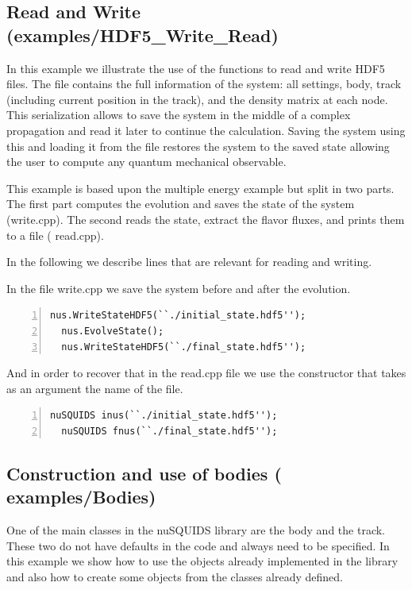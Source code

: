 \documentclass[3p,12pt]{elsarticle}
\newcommand{\ttf}{\ttfamily}
\begin{document}
\subsection{Read and Write \textnormal{({\ttf examples/HDF5\_Write\_Read})}}
\label{sec:readwrite}
In this example we illustrate the use of the functions to
read and write {\ttf HDF5} files. The file contains the full
information of the system: all settings, body, track (including
current position in the track), and the density matrix at each node.
This serialization allows to save the system
in the middle of a complex propagation and read it later to continue
the calculation. Saving the system using this and loading it from
the file restores the system to the saved state allowing the user to
compute any quantum mechanical observable.

This example is based upon the multiple energy example but
split in two parts. The first part computes the evolution and saves the
state of the system ({\ttf write.cpp}). The second reads the
state,  extract the flavor fluxes, and  prints them to a file ({\ttf
  read.cpp}).

In the following we describe lines that are relevant for reading and writing.

In the file {\ttf write.cpp} we save the system before and after the
evolution.
\begin{lstlisting}[frame=leftline, numbers =
  left,breaklines=true,label = ex:sin1]
  nus.WriteStateHDF5(``./initial_state.hdf5'');
  nus.EvolveState();
  nus.WriteStateHDF5(``./final_state.hdf5'');
\end{lstlisting}

And in order to recover that in the {\ttf read.cpp} file we use the
constructor that takes as an argument the name of the file.

\begin{lstlisting}[frame=leftline, numbers =
  left,breaklines=true,label = ex:sin1]
  nuSQUIDS inus(``./initial_state.hdf5'');
  nuSQUIDS fnus(``./final_state.hdf5''); 
\end{lstlisting}


\subsection{Construction and use of bodies \textnormal{({\ttf
      examples/Bodies})}}
\label{sec:body}
One of the main classes in the nuSQUIDS library are the body and the
track. These two do not have defaults in the code and always need to
be specified.
In this example we show how to use the objects already implemented in
the library and also how to create some objects from the classes
already defined.
\end{document}
